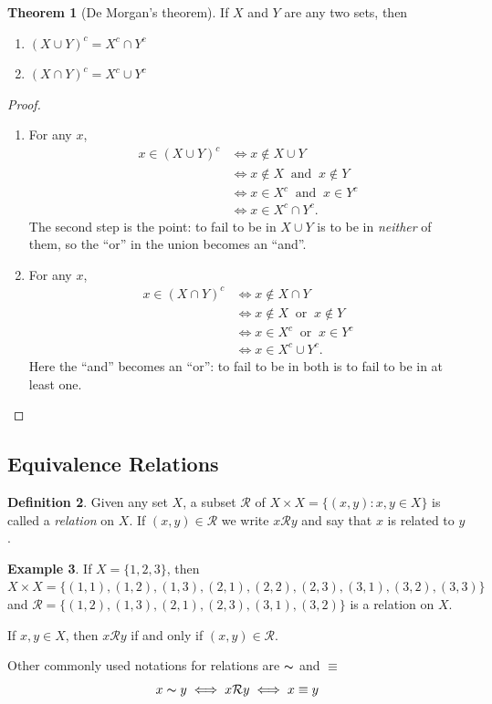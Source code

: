 \documentclass[11pt,a4paper]{article}
\theoremstyle{definition}
\newtheorem{thm}{Theorem}[subsection]
\newtheorem{defn}[thm]{Definition}
\newtheorem{exa}[thm]{Example}
\begin{document}
\begin{thm}[De Morgan's theorem]
If $X$ and $Y$ are any two sets, then
\begin{enumerate}
\item $(X\cup Y)^c=X^c\cap Y^c$
\item $(X\cap Y)^c=X^c\cup Y^c$
\end{enumerate} 
\end{thm}
\begin{proof}
\begin{enumerate}
\item For any $x$,
\begin{align*}
x\in (X\cup Y)^c &\iff x\notin X\cup Y\\
                 &\iff x\notin X \ \text{ and }\ x\notin Y\\
                 &\iff x\in X^c \ \text{ and }\ x\in Y^c\\
                 &\iff x\in X^c\cap Y^c.
\end{align*}
The second step is the point: to fail to be in $X\cup Y$ is to be in
\emph{neither} of them, so the ``or'' in the union becomes an ``and''.

\item For any $x$,
\begin{align*}
x\in (X\cap Y)^c &\iff x\notin X\cap Y\\
                 &\iff x\notin X \ \text{ or }\ x\notin Y\\
                 &\iff x\in X^c \ \text{ or }\ x\in Y^c\\
                 &\iff x\in X^c\cup Y^c.
\end{align*}
Here the ``and'' becomes an ``or'': to fail to be in both is to fail to be in
at least one.
\end{enumerate}
\end{proof}


\subsection{Equivalence Relations}
\begin{defn}
Given any set $X$, a subset $\mathcal{R}$ of $X\times X=\{(x,y):x,y\in X\}$ is
called a \emph{relation} on $X$. If $(x,y)\in\mathcal{R}$ we write
$x\mathcal{R}y$ and say that $x$ is related to $y$.
\end{defn}
\begin{exa}
If $X=\{1,2,3\}$, then $X\times X=\{(1,1), (1,2), (1,3), (2,1), (2,2), (2,3), (3,1), (3,2), (3,3)\}$ and $\mathcal{R}=\{(1,2), (1,3), (2,1), (2,3), (3,1),  (3,2)\}$ is a relation on $X$.

If $x,y\in X$, then $x\mathcal{R}y$ if and only if $(x,y)\in \mathcal{R}$.

Other commonly used notations for relations are $\thicksim$ and $\equiv$ $$x\thicksim y\iff x\mathcal{R}y\iff x\equiv y$$
\end{exa}
\end{document}
